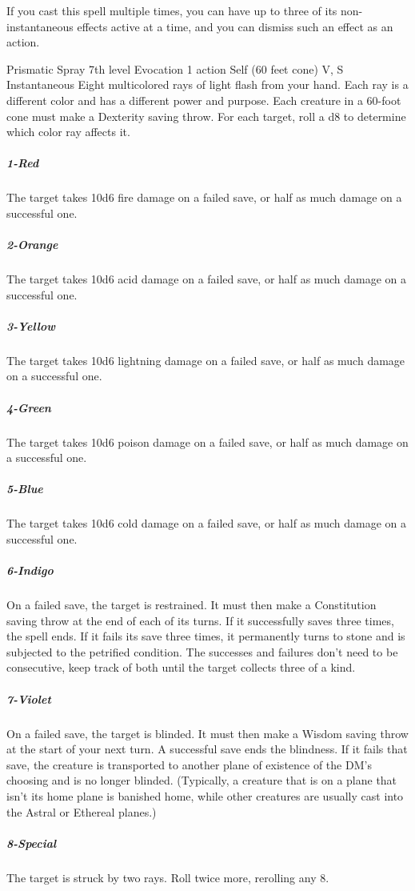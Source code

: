 \documentclass[10pt,a4paper,twoside,bg=print,twocolumn,openany,nodeprecatedcode]{dndbook}
\begin{document}
If you cast this spell multiple times, you can have up to three of its non-instantaneous effects active at a time, and you can dismiss such an effect as an action.



\DndSpellHeader%
{Prismatic Spray}
{7th level Evocation}
{1 action}
{Self (60 feet cone)}
{V, S}
{Instantaneous}
Eight multicolored rays of light flash from your hand. Each ray is a different color and has a different power and purpose. Each creature in a 60-foot cone must make a Dexterity saving throw. For each target, roll a d8 to determine which color ray affects it.

\subparagraph{1-Red}
The target takes 10d6 fire damage on a failed save, or half as much damage on a successful one.

\subparagraph{2-Orange}
The target takes 10d6 acid damage on a failed save, or half as much damage on a successful one.

\subparagraph{3-Yellow}
The target takes 10d6 lightning damage on a failed save, or half as much damage on a successful one.

\subparagraph{4-Green}
The target takes 10d6 poison damage on a failed save, or half as much damage on a successful one.

\subparagraph{5-Blue}
The target takes 10d6 cold damage on a failed save, or half as much damage on a successful one.

\subparagraph{6-Indigo}
On a failed save, the target is restrained. It must then make a Constitution saving throw at the end of each of its turns. If it successfully saves three times, the spell ends. If it fails its save three times, it permanently turns to stone and is subjected to the petrified condition. The successes and failures don't need to be consecutive, keep track of both until the target collects three of a kind.

\subparagraph{7-Violet}
On a failed save, the target is blinded. It must then make a Wisdom saving throw at the start of your next turn. A successful save ends the blindness. If it fails that save, the creature is transported to another plane of existence of the DM's choosing and is no longer blinded. (Typically, a creature that is on a plane that isn't its home plane is banished home, while other creatures are usually cast into the Astral or Ethereal planes.)

\subparagraph{8-Special}
The target is struck by two rays. Roll twice more, rerolling any 8.
\end{document}
